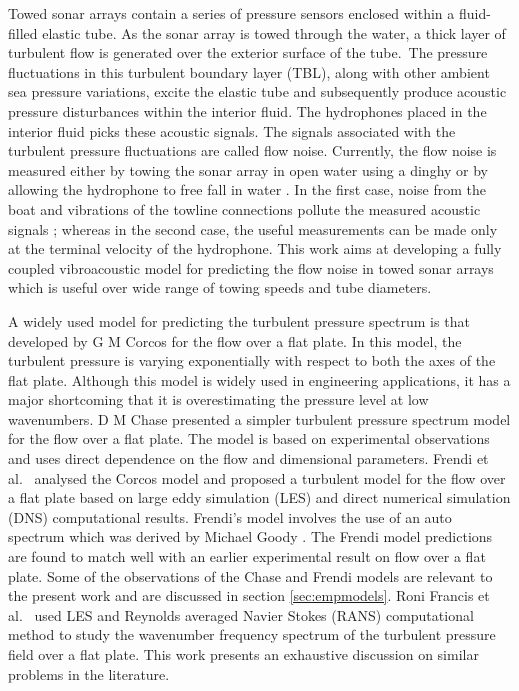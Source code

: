 \documentclass[twocolumn,10pt]{asme2ej}
\begin{document}
Towed sonar arrays contain a series of pressure sensors enclosed within a fluid-filled elastic tube. As the sonar array is towed through the water, a thick layer of turbulent flow is generated over the exterior surface of the tube.~The pressure fluctuations in this turbulent boundary layer (TBL), along with other ambient sea pressure variations, excite the elastic tube and subsequently produce acoustic pressure disturbances within the interior fluid. The hydrophones placed in the interior fluid picks these acoustic signals. The signals associated with the turbulent pressure fluctuations are called flow noise. Currently, the flow noise is measured either by towing the sonar array in open water using a dinghy or by allowing the hydrophone to free fall in water \cite{Sarath2010}. In the first case, noise from the boat and vibrations of the towline connections pollute the measured acoustic signals \cite{Unni2011}; whereas in the second case, the useful measurements can be made only at the terminal velocity of the hydrophone. This work aims at developing a fully coupled vibroacoustic model for predicting the flow noise in towed sonar arrays which is useful over wide range of towing speeds and tube diameters.

A widely used model for predicting the turbulent pressure spectrum is that developed by G M Corcos \cite{corcos1963} for the flow over a flat plate. In this model, the turbulent pressure is varying exponentially with respect to both the axes of the flat plate. Although this model is widely used in engineering applications, it has a major shortcoming that it is overestimating the pressure level at low wavenumbers. D M Chase \cite{Chase1981} presented a simpler turbulent pressure spectrum model for the flow over a flat plate. The model is based on experimental observations and uses direct dependence on the flow and dimensional parameters. Frendi et al.~\cite{frendi2020} analysed the Corcos \cite{corcos1963} model and proposed a turbulent model for the flow over a flat plate based on large eddy simulation (LES) and direct numerical simulation (DNS) computational results. Frendi's model involves the use of an auto spectrum which was derived by Michael Goody \cite{goody2004}. The Frendi model predictions are found to match well with an earlier experimental result on flow over a flat plate. Some of the observations of the Chase and Frendi models are relevant to the present work and are discussed in section \ref{sec:empmodels}. Roni Francis et al.~\cite{francis2023} used LES and Reynolds averaged Navier Stokes (RANS) computational method to study the wavenumber frequency spectrum of the turbulent pressure field over a flat plate. This work presents an exhaustive discussion on similar problems in the literature.
\end{document}
